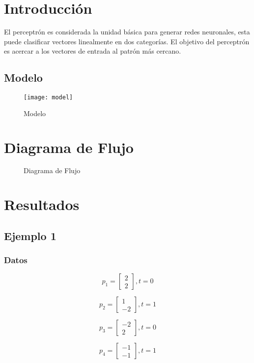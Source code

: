 \documentclass{article}
\begin{document}
\maketitle
\tableofcontents
\section{Introducción}
El perceptrón es considerada la unidad básica para generar redes neuronales, esta puede clasificar vectores linealmente en dos categorías.
El objetivo del perceptrón es acercar a los vectores de entrada al patrón más cercano.
\newpage
\subsection{Modelo}
\begin{figure}[h!]
	\caption{Modelo}
	\centering
	\texttt{[image: model]}
\end{figure}
\newpage
\section{Diagrama de Flujo}
\begin{figure}[htpb]
	\centering
	
	\caption{Diagrama de Flujo}
\end{figure}
\newpage
\section{Resultados}
\subsection{Ejemplo 1}
\subsubsection{Datos}
\[p_1=
\begin{bmatrix}
2\\
2
\end{bmatrix}
, t=0
\]

\[p_2=
\begin{bmatrix}
1\\
-2
\end{bmatrix}
, t=1
\]

\[p_3=
\begin{bmatrix}
-2\\
2
\end{bmatrix}
, t=0
\]

\[p_4=
\begin{bmatrix}
-1\\
-1
\end{bmatrix}
, t=1
\]
\end{document}

